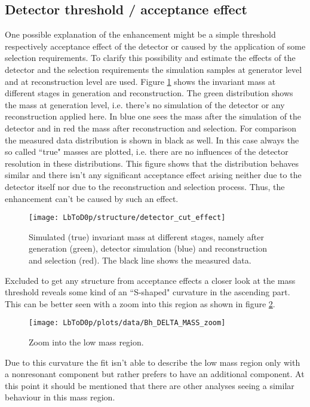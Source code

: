 \subsection{Detector threshold / acceptance effect}
One possible explanation of the enhancement might be a simple threshold respectively acceptance effect of the detector or caused by the application of some selection requirements.
To clarify this possibility and estimate the effects of the detector and the selection requirements the simulation samples at generator level and at reconstruction level are used.
Figure \ref{fig:detector_cut_effect} shows the invariant \Dz\proton mass at different stages in generation and reconstruction.
The green distribution shows the \Dz\proton mass at generation level, i.e. there's no simulation of the detector or any reconstruction applied here.
In blue one sees the \Dz\proton mass after the simulation of the detector and in red the mass after reconstruction and selection.
For comparison the measured data distribution is shown in black as well.
In this case always the so called ``true" masses are plotted, i.e. there are no influences of the detector resolution in these distributions.
This figure shows that the distribution behaves similar and there isn't any significant acceptance effect arising neither due to the detector itself nor due to the reconstruction and selection process. 
Thus, the enhancement can't be caused by such an effect.
\begin{figure}[hptb]
	\centering
	\texttt{[image: LbToD0p/structure/detector\_cut\_effect]}
	\caption{Simulated (true) invariant \Dz\proton mass at different stages, namely after generation (green), detector simulation (blue) and reconstruction and selection (red). The black line shows the measured data.}
	\label{fig:detector_cut_effect}
\end{figure}

Excluded to get any structure from acceptance effects a closer look at the \Dz\proton mass threshold reveals some kind of an ``S-shaped" curvature in the ascending part.
This can be better seen with a zoom into this region as shown in figure \ref{fig:mD0p_zoom}.
\begin{figure}[hptb]
	\centering
	\texttt{[image: LbToD0p/plots/data/Bh\_DELTA\_MASS\_zoom]}
	\caption{Zoom into the low \Dz\proton mass region.}
	\label{fig:mD0p_zoom}
\end{figure}

Due to this curvature the fit isn't able to describe the low \Dz\proton mass region only with a nonresonant component but rather prefers to have an additional component. 
At this point it should be mentioned that there are other analyses seeing a similar behaviour in this \Dz\proton mass region.


